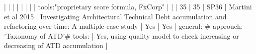 |    |            |      |                                                                      |                                                                                                                                                                          |                                                                                                                                                                                                                                                            |                                                                                                                                                                                                                                                                      |  tools:"proprietary score formula, FxCorp"                                                                                                                                                                                                                                                               |                                                                                                                                                                                                                                                                                                                                                                                                                                                                                              |
| 35 |         35 | SP36 | Martini et al 2015                                                   | Investigating Architectural Technical Debt accumulation and refactoring over time: A multiple-case study                                                                 | Yes                                                                                                                                                                                                                                                      | Yes                                                                                                                                                                                                                                                                | general: # approuch: 'Taxonomy of ATD'# tools:                                                                                                                                                                                                                                                           | Yes, using quality model to check increasing or decreasing of ATD accumulation                                                                                                                                                                                                                                                                                                                                                                                                           |
